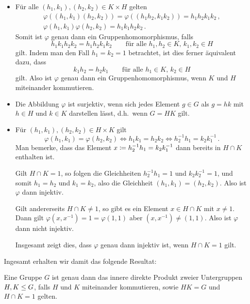 \begin{itemize}
  \item
    Für alle $(h_1, k_1), (h_2, k_2) \in K \times H$ gelten
    \begin{gather*}
        \varphi((h_1, k_1) (h_2, k_2))
      = \varphi((h_1 h_2, k_1 k_2))
      = h_1 h_2 k_1 k_2 \,,
      \\
        \varphi(h_1, k_1) \varphi(h_2, k_2)
      = h_1 k_1 h_2 k_2 \,.
    \end{gather*}
    Somit ist $\varphi$ genau dann ein Gruppenhomomorphismus, falls
    \[
        h_1 k_1 h_2 k_2
      = h_1 h_2 k_1 k_2
      \qquad
      \text{für alle $h_1, h_2 \in K$, $k_1, k_2 \in H$}
    \]
    gilt.
    Indem man den Fall $h_1 = k_2 = 1$ betrachtet, ist dies ferner äquivalent dazu, dass
    \[
        k_1 h_2
      = h_2 k_1
      \qquad
      \text{für alle $h_1 \in K$, $k_2 \in H$}
    \]
    gilt.
    Also ist $\varphi$ genau dann ein Gruppenhomomorphismus, wenn $K$ und $H$ miteinander kommutieren.
    
  \item
    Die Abbildung $\varphi$ ist surjektiv, wenn sich jedes Element $g \in G$ als $g = hk$ mit $h \in H$ und $k \in K$ darstellen lässt, d.h.\ wenn $G = HK$ gilt.
    
  \item
    Für $(h_1, k_1), (h_2, k_2) \in H \times K$ gilt
    \[
            \varphi(h_1, k_1) = \varphi(h_2, k_2)
      \iff  h_1 k_1 = h_2 k_2
      \iff  h_2^{-1} h_1 = k_2 k_1^{-1} \,.
    \]
    Man bemerke, dass das Element $x \coloneqq h_2^{-1} h_1 = k_2 k_1^{-1}$ dann bereits in $H \cap K$ enthalten ist.
    
    Gilt $H \cap K = 1$, so folgen die Gleichheiten $h_2^{-1} h_1 = 1$ und $k_2 k_2^{-1} = 1$, und somit $h_1 = h_2$ und $k_1 = k_2$, also die Gleichheit $(h_1, k_1) = (h_2, k_2)$.
    Also ist $\varphi$ dann injektiv.
    
    Gilt andererseits $H \cap K \neq 1$, so gibt es ein Element $x \in H \cap K$ mit $x \neq 1$.
    Dann gilt $\varphi(x, x^{-1}) = 1 = \varphi(1,1)$ aber $(x, x^{-1}) \neq (1,1)$.
    Also ist $\varphi$ dann nicht injektiv.
    
    Insgesamt zeigt dies, dass $\varphi$ genau dann injektiv ist, wenn $H \cap K = 1$ gilt.
\end{itemize}

Ingesamt erhalten wir damit das folgende Resultat:

\begin{proposition}
  \label{proposition: first characterization}
  Eine Gruppe $G$ ist genau dann das innere direkte Produkt zweier Untergruppen $H, K \leq G$, falls $H$ und $K$ miteinander kommutieren, sowie $HK = G$ und $H \cap K = 1$ gelten.
\end{proposition}





